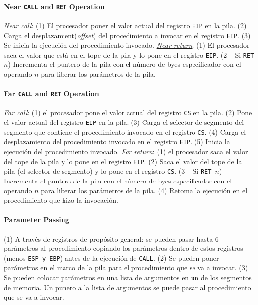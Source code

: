 \paragraph{Near \texttt{CALL} and \texttt{RET} Operation}
\underline{\textit{Near call}}: (1) El procesador poner el valor actual del registro \texttt{EIP} en la pila. (2) Carga el desplazamient(\textit{offset}) del procedimiento a invocar en el registro \texttt{EIP}. (3) Se inicia la ejecución del procedimiento invocado. \underline{\textit{Near return}}: (1) El procesador saca el valor que está en el tope de la pila y lo pone en el registro \texttt{EIP}. (2 -- Si \texttt{RET $n$}) Incrementa el puntero de la pila con el número de byes especificador con el operando $n$ para liberar los parámetros de la pila.

\paragraph{Far \texttt{CALL} and \texttt{RET} Operation}
\underline{\textit{Far call}}: (1) el procesador pone el valor actual del registro \texttt{CS} en la pila. (2) Pone el valor actual del registro \texttt{EIP} en la pila. (3) Carga el selector de segmento del segmento que contiene el procedimiento invocado en el registro \texttt{CS}. (4) Carga el desplazamiento del procedimiento invocado en el registro \texttt{EIP}. (5) Inicia la ejecución del procedimiento invocado. \underline{\textit{Far return}}: (1) el procesador saca el valor del tope de la pila y lo pone en el registro \texttt{EIP}. (2) Saca el valor del tope de la pila (el selector de segmento) y lo pone en el registro \texttt{CS}. (3 -- Si \texttt{RET $n$}) Incrementa el puntero de la pila con el número de byes especificador con el operando $n$ para liberar los parámetros de la pila. (4) Retoma la ejecución en el procedimiento que hizo la invocación.

\paragraph{Parameter Passing}
(1) A través de registros de propósito general: se pueden pasar hasta 6 parámetros al procedimiento copiando los parámetros dentro de estos registros (menos \texttt{ESP \textnormal{y} EBP}) antes de la ejecución de \texttt{CALL}. (2) Se pueden poner parámetros en el marco de la pila para el procedimiento que se va a invocar. (3) Se pueden colocar parámetros en una lista de argumentos en un de los segmentos de memoria. Un punero a la lista de argumentos se puede pasar al procedimiento que se va a invocar.



